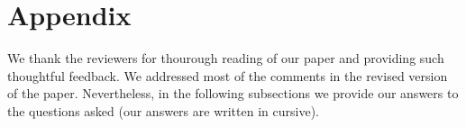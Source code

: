 \newpage

\section*{Appendix}

We thank the reviewers for thourough reading of our paper and providing such thoughtful feedback.
We addressed most of the comments in the revised version of the paper.
Nevertheless, in the following subsections we provide our answers to the questions asked (our answers are written in cursive).






